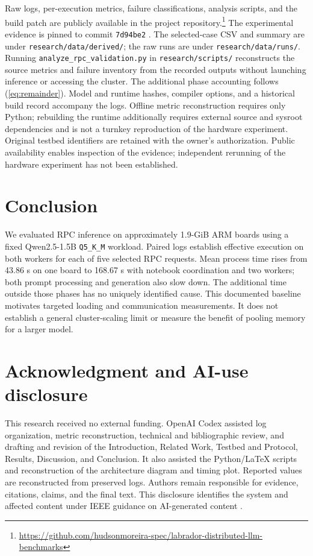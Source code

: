 \documentclass[letterpaper,conference]{IEEEtran}
\begin{document}
Raw logs, per-execution metrics, failure classifications, analysis scripts, and the build patch are publicly available in the project repository.\footnote{\url{https://github.com/hudsonmoreira-spec/labrador-distributed-llm-benchmarks}} The experimental evidence is pinned to commit \texttt{7d94be2} \cite{evidence}. The selected-case CSV and summary are under \texttt{research/data/derived/}; the raw runs are under \texttt{research/data/runs/}. Running \texttt{analyze\_rpc\_validation.py} in \texttt{research/scripts/} reconstructs the source metrics and failure inventory from the recorded outputs without launching inference or accessing the cluster. The additional phase accounting follows (\ref{eq:remainder}). Model and runtime hashes, compiler options, and a historical build record accompany the logs. Offline metric reconstruction requires only Python; rebuilding the runtime additionally requires external source and sysroot dependencies and is not a turnkey reproduction of the hardware experiment. Original testbed identifiers are retained with the owner’s authorization. Public availability enables inspection of the evidence; independent rerunning of the hardware experiment has not been established.

\section{Conclusion}

We evaluated RPC inference on approximately 1.9-GiB ARM boards using a fixed Qwen2.5-1.5B \texttt{Q5\_K\_M} workload. Paired logs establish effective execution on both workers for each of five selected RPC requests. Mean process time rises from 43.86 s on one board to 168.67 s with notebook coordination and two workers; both prompt processing and generation also slow down. The additional time outside those phases has no uniquely identified cause. This documented baseline motivates targeted loading and communication measurements. It does not establish a general cluster-scaling limit or measure the benefit of pooling memory for a larger model.

\section*{Acknowledgment and AI-use disclosure}

This research received no external funding. OpenAI Codex assisted log organization, metric reconstruction, technical and bibliographic review, and drafting and revision of the Introduction, Related Work, Testbed and Protocol, Results, Discussion, and Conclusion. It also assisted the Python/LaTeX scripts and reconstruction of the architecture diagram and timing plot. Reported values are reconstructed from preserved logs. Authors remain responsible for evidence, citations, claims, and the final text. This disclosure identifies the system and affected content under IEEE guidance on AI-generated content \cite{ieeeai}.



\end{document}
